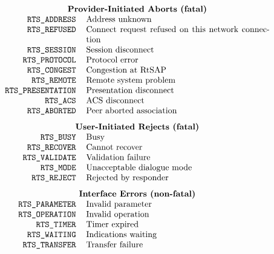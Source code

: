 
\normalsize
\[\begin{tabular}{rp{3.0in}}
    \multicolumn{2}{c}{\bf Provider-Initiated Aborts (fatal)}\\
\tt RTS\_ADDRESS&	Address unknown\\
\tt RTS\_REFUSED&	Connect request refused on this network connection\\
\tt RTS\_SESSION&	Session disconnect\\
\tt RTS\_PROTOCOL&	Protocol error\\
\tt RTS\_CONGEST&	Congestion at RtSAP\\
\tt RTS\_REMOTE&	Remote system problem\\
\tt RTS\_PRESENTATION&	Presentation disconnect\\
\tt RTS\_ACS&		ACS disconnect\\
\tt RTS\_ABORTED&	Peer aborted association\\[0.1in]
    \multicolumn{2}{c}{\bf User-Initiated Rejects (fatal)}\\
\tt RTS\_BUSY&		Busy\\
\tt RTS\_RECOVER&	Cannot recover\\
\tt RTS\_VALIDATE&	Validation failure\\
\tt RTS\_MODE&		Unacceptable dialogue mode\\
\tt RTS\_REJECT&	Rejected by responder\\[0.1in]
    \multicolumn{2}{c}{\bf Interface Errors (non-fatal)}\\
\tt RTS\_PARAMETER&	Invalid parameter\\
\tt RTS\_OPERATION&	Invalid operation\\
\tt RTS\_TIMER&		Timer expired\\
\tt RTS\_WAITING&	Indications waiting\\
\tt RTS\_TRANSFER&	Transfer failure
\end{tabular}\]
